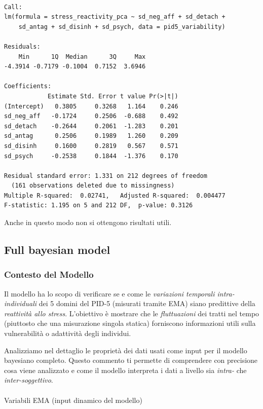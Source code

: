\documentclass[
  11pt,
  a4paper,
  onecolumn]{article}
\makeatletter
\let\oldparagraph\paragraph
\renewcommand{\paragraph}{
    \@ifstar
      \xxxParagraphStar
      \xxxParagraphNoStar
  }
\newcommand{\xxxParagraphStar}[1]{\oldparagraph*{#1}\mbox{}}
\newcommand{\xxxParagraphNoStar}[1]{\oldparagraph{#1}\mbox{}}
\makeatother
\begin{document}
\begin{verbatim}

Call:
lm(formula = stress_reactivity_pca ~ sd_neg_aff + sd_detach + 
    sd_antag + sd_disinh + sd_psych, data = pid5_variability)

Residuals:
    Min      1Q  Median      3Q     Max 
-4.3914 -0.7179 -0.1004  0.7152  3.6946 

Coefficients:
            Estimate Std. Error t value Pr(>|t|)
(Intercept)   0.3805     0.3268   1.164    0.246
sd_neg_aff   -0.1724     0.2506  -0.688    0.492
sd_detach    -0.2644     0.2061  -1.283    0.201
sd_antag      0.2506     0.1989   1.260    0.209
sd_disinh     0.1600     0.2819   0.567    0.571
sd_psych     -0.2538     0.1844  -1.376    0.170

Residual standard error: 1.331 on 212 degrees of freedom
  (161 observations deleted due to missingness)
Multiple R-squared:  0.02741,   Adjusted R-squared:  0.004477 
F-statistic: 1.195 on 5 and 212 DF,  p-value: 0.3126
\end{verbatim}

Anche in questo modo non si ottengono risultati utili.

\subsection{Full bayesian model}\label{full-bayesian-model}

\subsubsection{Contesto del Modello}\label{contesto-del-modello}

Il modello ha lo scopo di verificare se e come le \emph{variazioni
temporali intra-individuali} dei 5 domini del PID-5 (misurati tramite
EMA) siano predittive della \emph{reattività allo stress}. L'obiettivo è
mostrare che le \emph{fluttuazioni} dei tratti nel tempo (piuttosto che
una misurazione singola statica) forniscono informazioni utili sulla
vulnerabilità o adattività degli individui.

Analizziamo nel dettaglio le proprietà dei dati usati come input per il
modello bayesiano completo. Questo commento ti permette di comprendere
con precisione cosa viene analizzato e come il modello interpreta i dati
a livello sia \emph{intra-} che \emph{inter-soggettivo}.

\paragraph{Variabili EMA (input dinamico del
modello)}\label{variabili-ema-input-dinamico-del-modello}
\end{document}
